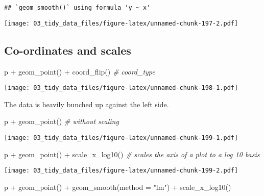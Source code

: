 \documentclass[
]{book}
\newenvironment{Shaded}{\begin{snugshade}}{\end{snugshade}}
\newcommand{\AttributeTok}[1]{\textcolor[rgb]{0.77,0.63,0.00}{#1}}
\newcommand{\CommentTok}[1]{\textcolor[rgb]{0.56,0.35,0.01}{\textit{#1}}}
\newcommand{\FunctionTok}[1]{\textcolor[rgb]{0.00,0.00,0.00}{#1}}
\newcommand{\NormalTok}[1]{#1}
\newcommand{\SpecialCharTok}[1]{\textcolor[rgb]{0.00,0.00,0.00}{#1}}
\newcommand{\StringTok}[1]{\textcolor[rgb]{0.31,0.60,0.02}{#1}}
\begin{document}
\begin{verbatim}
## `geom_smooth()` using formula 'y ~ x'
\end{verbatim}

\texttt{[image: 03\_tidy\_data\_files/figure-latex/unnamed-chunk-197-2.pdf]}

\hypertarget{co-ordinates-and-scales}{%
\subsection{Co-ordinates and scales}\label{co-ordinates-and-scales}}

\begin{Shaded}
\begin{Highlighting}[]
\NormalTok{p }\SpecialCharTok{+} \FunctionTok{geom\_point}\NormalTok{() }\SpecialCharTok{+}
  \FunctionTok{coord\_flip}\NormalTok{() }\CommentTok{\# coord\_type}
\end{Highlighting}
\end{Shaded}

\texttt{[image: 03\_tidy\_data\_files/figure-latex/unnamed-chunk-198-1.pdf]}

The data is heavily bunched up against the left side.

\begin{Shaded}
\begin{Highlighting}[]
\NormalTok{p }\SpecialCharTok{+} \FunctionTok{geom\_point}\NormalTok{() }\CommentTok{\# without scaling}
\end{Highlighting}
\end{Shaded}

\texttt{[image: 03\_tidy\_data\_files/figure-latex/unnamed-chunk-199-1.pdf]}

\begin{Shaded}
\begin{Highlighting}[]
\NormalTok{p }\SpecialCharTok{+} \FunctionTok{geom\_point}\NormalTok{() }\SpecialCharTok{+}
  \FunctionTok{scale\_x\_log10}\NormalTok{() }\CommentTok{\# scales the axis of a plot to a log 10 basis}
\end{Highlighting}
\end{Shaded}

\texttt{[image: 03\_tidy\_data\_files/figure-latex/unnamed-chunk-199-2.pdf]}

\begin{Shaded}
\begin{Highlighting}[]
\NormalTok{p }\SpecialCharTok{+} \FunctionTok{geom\_point}\NormalTok{() }\SpecialCharTok{+}
  \FunctionTok{geom\_smooth}\NormalTok{(}\AttributeTok{method =} \StringTok{"lm"}\NormalTok{) }\SpecialCharTok{+}
  \FunctionTok{scale\_x\_log10}\NormalTok{()}
\end{Highlighting}
\end{Shaded}
\end{document}
